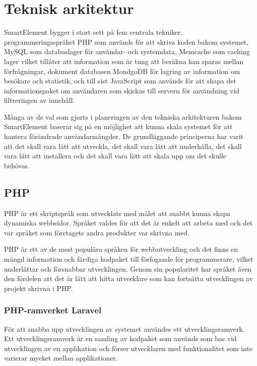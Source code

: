 \section{Teknisk arkitektur}

SmartElement bygger i stort sett på fem centrala tekniker, programmeringsspråket PHP som används för att skriva koden bakom systemet, MySQL som databaslager för användar- och systemdata, Memcache som caching lager vilket tillåter att information som är tung att beräkna kan sparas mellan förfrågningar, dokument databasen MondgoDB för lagring av information om besökare och statistik, och till sist JavaScript som används för att skapa det informationspaket om användaren som skickas till servern för användning vid filtreringen av innehåll.

Många av de val som gjorts i planeringen av den tekniska arkitekturen bakom SmartElement baserar sig på en möjlighet att kunna skala systemet för att hantera förändrade användarmängder. De grundläggande principerna har varit att det skall vara lätt att utveckla, det skall vara lätt att underhålla, det skall vara lätt att installera och det skall vara lätt att skala upp om det skulle behövas.

\subsection{PHP}

PHP är ett skriptspråk som utvecklats med målet att snabbt kunna skapa dynamiska webbsidor. \citep{phpmanual} Språket valdes för att det är enkelt att arbeta med och det var språket som företagets andra produkter var skrivna med.

PHP är ett av de mest populära språken för webbutveckling \citep{tiobe} och det finns en mängd information och färdiga kodpaket till förfogande för programmerare, vilket underlättar och försnabbar utvecklingen. Genom sin popularitet har språket även den fördelen att det är lätt att hitta utvecklare som kan fortsätta utvecklingen av projekt skrivna i PHP.

\subsubsection{PHP-ramverket Laravel}

För att snabba upp utvecklingen av systemet användes ett utvecklingsramverk. Ett utvecklingsramverk är en samling av kodpaket som används som bas vid utvecklingen av en applikation och förser utvecklaren med funktionalitet som inte varierar mycket mellan applikationer.

